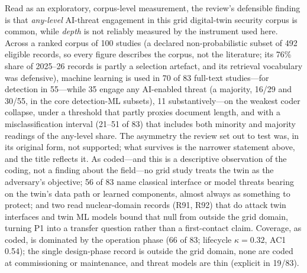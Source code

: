 \documentclass[preprint,12pt]{elsarticle}
\renewcommand{\_}{\plainunderscore\allowbreak}
\begin{document}
Read as an exploratory, corpus-level measurement, the review's defensible finding is that
\emph{any-level} AI-threat engagement in this grid digital-twin security corpus is common,
while \emph{depth} is not reliably measured by the instrument used here. Across a ranked
corpus of 100 studies (a declared non-probabilistic subset of 492 eligible records, so
every figure describes the corpus, not the literature; its 76\% share of 2025--26 records
is partly a selection artefact, and its retrieval vocabulary was defensive), machine
learning is used in 70 of 83 full-text studies---for detection in 55---while 35 engage
any AI-enabled threat (a majority, 16/29 and 30/55, in the core detection-ML subsets), 11
substantively---on the weakest coder collapse, under a threshold that partly proxies
document length, and with a misclassification interval (21--51 of 83) that includes both
minority and majority readings of the any-level share. The asymmetry the review set out
to test was, in its original form, not supported; what survives is the narrower statement
above, and the title reflects it. As coded---and this is a
descriptive observation of the coding, not a finding about the field---no grid study
treats the twin as the adversary's objective; 56 of 83 name classical
interface or model threats bearing on
the twin's data path or learned components, almost
always as something to protect; and two read
nuclear-domain records (R91, R92) that do attack twin interfaces and twin ML models bound
that null from outside the grid domain, turning P1 into a transfer question rather than a
first-contact claim. Coverage, as coded, is dominated by the operation phase (66 of 83;
lifecycle $\kappa = 0.32$, AC1 0.54); the single design-phase record is outside the grid domain,
none are coded at commissioning or maintenance, and threat models are thin (explicit in
19/83).
\end{document}
